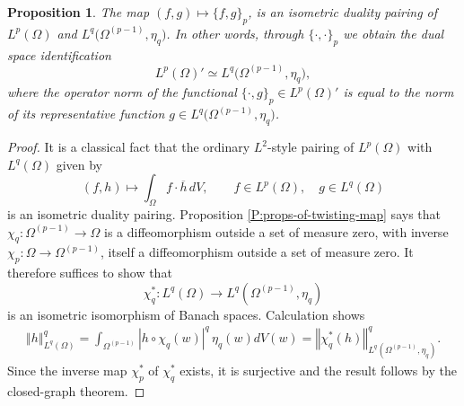 \documentclass[letterpaper,11pt,reqno]{amsart}
\theoremstyle{plain}
\newtheorem{proposition}[equation]{Proposition}
\theoremstyle{definition}
\theoremstyle{remark}
\theoremstyle{remark}
\numberwithin{equation}{section}
\newcommand{\abs}[1]{\left\vert#1\right\vert}
\newcommand{\norm}[1]{\left\Vert#1\right\Vert}
\newcommand{\ol}{\overline}
\begin{document}
\begin{proposition}\label{prop-pairing}
The map $(f,g) \mapsto \{f,g\}_{p}$, is an isometric duality pairing of $L^p(\Omega)$ and $L^q \big(\Omega^{(p-1)},\eta_q \big)$.
In other words, through $\{\cdot,\cdot \}_p$ we obtain the dual space identification
\[
L^p(\Omega)' \simeq L^q\big(\Omega^{(p-1)},\eta_q \big),
\]
where the operator norm of the functional $\{\cdot,g\}_p \in L^p(\Omega)'$ is equal to the norm of its representative function $g \in L^q\big(\Omega^{(p-1)},\eta_q \big)$.
\end{proposition}
\begin{proof}
It is a classical fact that the ordinary $L^2$-style pairing of $L^p(\Omega)$ with $L^q(\Omega)$ given by 
\[
(f,h) \mapsto \int_\Omega f \cdot \ol{h}\, dV, \qquad f \in L^p(\Omega), \quad g \in L^q(\Omega)
\]
is an isometric duality pairing. 
Proposition \ref{P:props-of-twisting-map} says that $\chi_q:\Omega^{(p-1)}\to \Omega$ is a diffeomorphism outside a set of measure zero, with inverse $\chi_p:\Omega\to \Omega^{(p-1)}$, itself a diffeomorphism outside a set of measure zero. 
It therefore suffices to show that
\begin{equation}\label{E:chi_p-pullback}
    \chi_q^*: L^q(\Omega) \to L^q(\Omega^{(p-1)},\eta_q)
\end{equation}
is an isometric isomorphism of Banach spaces. 
Calculation shows
\begin{align}
\norm{h}^q_{L^q(\Omega)} 
= \int_{\Omega^{(p-1)}} \abs{h \circ \chi_q(w)}^q \,\eta_q(w) dV(w) 
= \norm{\chi_q^*(h)}^q_{L^q(\Omega^{(p-1)},\eta_q)} \label{E:Chi_p-norm-equiv1}.
\end{align}
Since the inverse map $\chi_p^*$ of $\chi_q^*$ exists, it is surjective and the result follows by the closed-graph theorem.
\end{proof}
\end{document}
